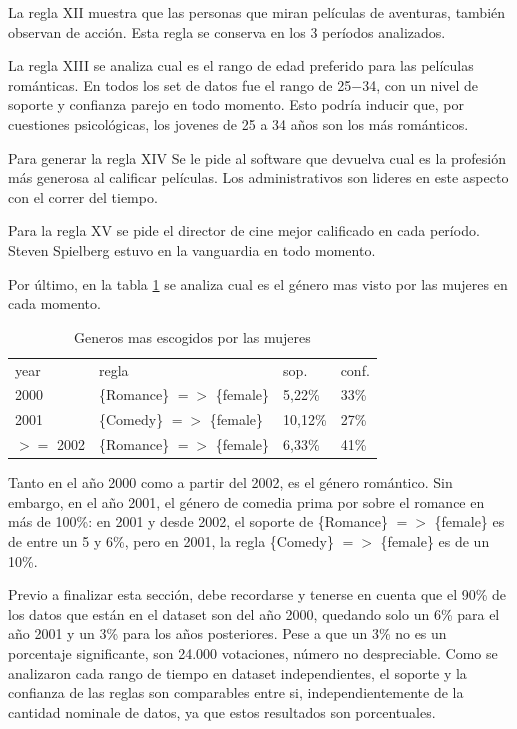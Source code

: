 \documentclass[journal]{IEEEtran}
\begin{document}
La regla XII muestra que las personas que miran películas de aventuras, también
observan de acción. Esta regla se conserva en los 3 períodos analizados.

La regla XIII se analiza cual es el rango de edad preferido para las películas
románticas. En todos los set de datos fue el rango de 25$-$34, con un nivel
de soporte y confianza parejo en todo momento. Esto podría inducir que, 
por cuestiones psicológicas, los jovenes de 25 a 34 años son los más 
románticos.

Para generar la regla XIV Se le pide al software que devuelva cual es la profesión
más generosa al calificar películas. Los administrativos son lideres en este
aspecto con el correr del tiempo.

Para la regla XV se pide el director de cine mejor calificado en cada período.
Steven Spielberg estuvo en la vanguardia en todo momento.

Por último, en la tabla \ref{genre_female} se analiza cual 
es el género mas visto por las mujeres en cada momento.

\begin{table}[ht!]
\caption{Generos mas escogidos por las mujeres}
\label{genre_female}
\centering
\begin{tabular}{l l l l }
year & regla & sop. & conf. \\
2000 & \{Romance\} $=$$>$ \{female\} & 5,22\% & 33\%  \\
2001 & \{Comedy\} $=$$>$ \{female\} & 10,12\% & 27\%  \\
$>$$=$ 2002 & \{Romance\} $=$$>$ \{female\} & 6,33\% & 41\%  \\
\end{tabular}
\end{table}

Tanto en el año 2000 como a partir del 2002, es el género romántico. Sin embargo, 
en el año 2001, el género de comedia prima por sobre el romance en más de 100\%:
en 2001 y desde 2002, el soporte de \{Romance\} $=$$>$ \{female\} es de entre
un 5 y 6\%, pero en 2001, la regla \{Comedy\} $=$$>$ \{female\} es de un 10\%.

Previo a finalizar esta sección, debe recordarse y tenerse en cuenta que 
 el 90\% de los datos que están en el dataset son del año 2000, quedando solo un 6\%
para el año 2001 y un 3\% para los años posteriores. Pese a que un  3\% 
no es un porcentaje significante, son 24.000 votaciones, número no despreciable.
Como se analizaron cada rango de tiempo en dataset independientes, el soporte
y la confianza de las reglas son comparables entre si, independientemente de la 
cantidad nominale de datos, ya que estos resultados son porcentuales.
\end{document}
